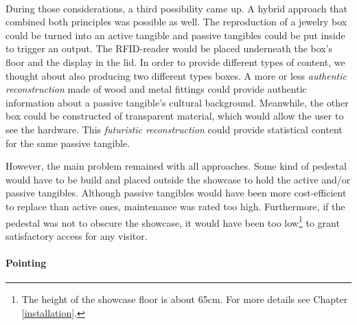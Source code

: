\\
During those considerations, a third possibility came up. A hybrid approach that combined both principles was possible as well. The reproduction of a jewelry box could be turned into an active tangible and passive tangibles could be put inside to trigger an output. The \ac{RFID}-reader would be placed underneath the box's floor and the display in the lid. In order to provide different types of content, we thought about also producing two different types boxes. A more or less \textit{authentic reconstruction} made of wood and metal fittings could provide authentic information about a passive tangible's cultural background. Meanwhile, the other box could be constructed of transparent material, which would allow the user to see the hardware. This \textit{futuristic reconstruction} could provide statistical content for the same passive tangible.

However, the main problem remained with all approaches. Some kind of pedestal would have to be build and placed outside the showcase to hold the active and/or passive tangibles. Although passive tangibles would have been more cost-efficient to replace than active ones, maintenance was rated too high. Furthermore, if the pedestal was not to obscure the showcase, it would have been too low\footnote{The height of the showcase floor is about 65cm. For more details see Chapter \ref{installation}.} to grant satisfactory access for any visitor.


\paragraph{Pointing}


